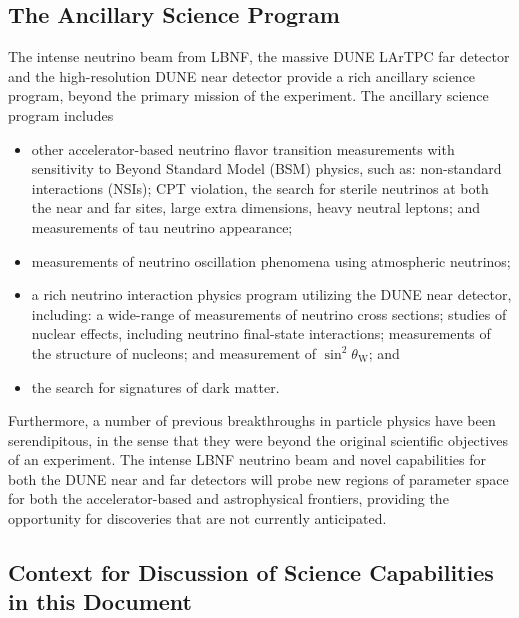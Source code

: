 \subsection{The Ancillary Science Program}

The intense neutrino beam from LBNF, the massive DUNE LArTPC far detector and the high-resolution
  DUNE near detector provide a rich ancillary science program, beyond the primary mission of the experiment. The ancillary science program includes
\begin{itemize}
     \item other accelerator-based neutrino flavor transition measurements with sensitivity to Beyond Standard Model (BSM) physics, such as: non-standard interactions (NSIs); CPT violation, the search for sterile neutrinos at both the near and far sites, large extra dimensions, heavy neutral leptons;
 and measurements of tau neutrino appearance;
     \item measurements of neutrino oscillation phenomena using atmospheric neutrinos;
     \item a rich neutrino interaction physics program utilizing the DUNE near detector, including: a wide-range of measurements of neutrino cross sections; studies of nuclear effects, including neutrino final-state interactions; measurements of the structure of nucleons; and  measurement of $\sin^2\theta_\text{W}$; and
     \item  the search for signatures of dark matter.
\end{itemize} 

Furthermore, a number of previous breakthroughs in particle physics have been serendipitous, in the sense that they were beyond the
original scientific objectives of an experiment. The intense LBNF neutrino beam and novel capabilities for both 
the DUNE near and far detectors will probe new regions of parameter space for both the accelerator-based and astrophysical frontiers, 
providing the opportunity for discoveries that are not currently anticipated.

\subsection{Context for Discussion of Science Capabilities in this Document}

